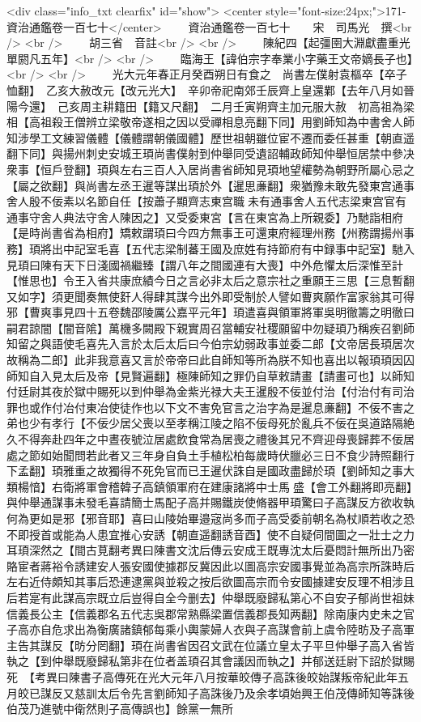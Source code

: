 <div class="info_txt clearfix" id="show">
<center style="font-size:24px;">171-資治通鑑卷一百七十</center>
  　　資治通鑑卷一百七十　　宋　司馬光　撰<br />
<br />
　　胡三省　音註<br />
<br />
　　陳紀四【起彊圉大淵獻盡重光單閼凡五年】<br />
<br />
　　臨海王【諱伯宗字奉業小字藥王文帝嫡長子也】<br />
<br />
　　光大元年春正月癸酉朔日有食之　尚書左僕射袁樞卒【卒子恤翻】　乙亥大赦改元【改元光大】　辛卯帝祀南郊壬辰齊上皇還鄴【去年八月如晉陽今還】　己亥周主耕籍田【籍又尺翻】　二月壬寅朔齊主加元服大赦　初高祖為梁相【高祖殺王僧辨立梁敬帝遂相之因以受禪相息亮翻下同】用劉師知為中書舍人師知涉學工文練習儀體【儀體謂朝儀國體】歷世祖朝雖位宦不遷而委任甚重【朝直遥翻下同】與揚州刺史安城王頊尚書僕射到仲舉同受遺詔輔政師知仲舉恒居禁中參决衆事【恒戶登翻】頊與左右三百人入居尚書省師知見頊地望權勢為朝野所屬心忌之【屬之欲翻】與尚書左丞王暹等謀出頊於外【暹思亷翻】衆猶豫未敢先發東宫通事舍人殷不佞素以名節自任【按蕭子顯齊志東宫職未有通事舍人五代志梁東宫官有通事守舍人典法守舍人陳因之】又受委東宮【言在東宮為上所親委】乃馳詣相府【是時尚書省為相府】矯敕謂頊曰今四方無事王可還東府經理州務【州務謂揚州事務】頊將出中記室毛喜【五代志梁制蕃王國及庶姓有持節府有中録事中記室】馳入見頊曰陳有天下日淺國禍繼臻【謂八年之間國連有大喪】中外危懼太后深惟至計【惟思也】令王入省共康庶績今日之言必非太后之意宗社之重願王三思【三息暫翻又如字】須更聞奏無使姧人得肆其謀今出外即受制於人譬如曹爽願作富家翁其可得邪【曹爽事見四十五卷魏邵陵厲公嘉平元年】頊遣喜與領軍將軍吳明徹籌之明徹曰嗣君諒闇【闇音隂】萬機多闕殿下親實周召當輔安社稷願留中勿疑頊乃稱疾召劉師知留之與語使毛喜先入言於太后太后曰今伯宗幼弱政事並委二郎【文帝居長頊居次故稱為二郎】此非我意喜又言於帝帝曰此自師知等所為朕不知也喜出以報頊頊因囚師知自入見太后及帝【見賢遍翻】極陳師知之罪仍自草敕請畫【請畫可也】以師知付廷尉其夜於獄中賜死以到仲舉為金紫光禄大夫王暹殷不佞並付治【付治付有司治罪也或作付冶付東冶使徒作也以下文不害免官言之治字為是暹息亷翻】不佞不害之弟也少有孝行【不佞少居父喪以至孝稱江陵之陷不佞母死於亂兵不佞在吳道路隔絶久不得奔赴四年之中晝夜號泣居處飲食常為居喪之禮後其兄不齊迎母喪歸葬不佞居處之節如始聞問若此者又三年身自負土手植松柏每歲時伏臘必三日不食少詩照翻行下孟翻】頊雅重之故獨得不死免官而已王暹伏誅自是國政盡歸於頊【劉師知之事大類楊愔】右衛將軍會稽韓子高鎮領軍府在建康諸將中士馬盛【會工外翻將即亮翻】與仲舉通謀事未發毛喜請簡士馬配子高并賜鐵炭使脩器甲頊驚曰子高謀反方欲收執何為更如是邪【邪音耶】喜曰山陵始畢邉宼尚多而子高受委前朝名為杖順若收之恐不即授首或能為人患宜推心安誘【朝直遥翻誘音酉】使不自疑伺間圖之一壯士之力耳頊深然之【間古莧翻考異曰陳書文沈后傳云安成王既專沈太后憂悶計無所出乃密賂宦者蔣裕令誘建安人張安國使據郡反冀因此以圖高宗安國事覺並為高宗所誅時后左右近侍頗知其事后恐連逮黨與並殺之按后欲圖高宗而令安國據建安反理不相涉且后若寔有此謀高宗既立后豈得自全今删去】仲舉既廢歸私第心不自安子郁尚世祖妹信義長公主【信義郡名五代志吳郡常熟縣梁置信義郡長知两翻】除南康内史未之官子高亦自危求出為衡廣諸鎮郁每乘小輿蒙婦人衣與子高謀會前上虞令陸昉及子高軍主告其謀反【昉分罔翻】頊在尚書省因召文武在位議立皇太子平旦仲舉子高入省皆執之【到仲舉既廢歸私第非在位者盖頊召其會議因而執之】并郁送廷尉下詔於獄賜死　【考異曰陳書子高傳死在光大元年八月按華皎傳子高誅後皎始謀叛帝紀此年五月皎已謀反又慈訓太后令先言劉師知子高誅後乃及余孝頃始興王伯茂傳師知等誅後伯茂乃進號中衛然則子高傳誤也】餘黨一無所